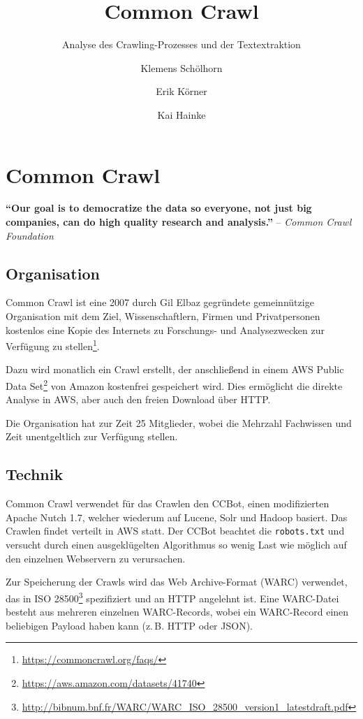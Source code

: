 \documentclass[a4paper,12pt,titlepage=false]{scrreprt}
\title{\vspace{3cm}Common Crawl}
\subtitle{Analyse des Crawling-Prozesses und der Textextraktion}
\author{Klemens Schölhorn \and Erik Körner \and Kai Hainke}
\begin{document}
\maketitle
\vspace{2cm}
\tableofcontents

\onehalfspacing

\chapter{Common Crawl}

\textbf{``Our goal is to democratize the data so everyone, not just big companies, can do high quality research and analysis.''}
\hfill-- \textit{Common Crawl Foundation}

\section{Organisation}

Common Crawl ist eine 2007 durch Gil Elbaz gegründete gemeinnützige Organisation mit dem Ziel, Wissenschaftlern, Firmen und Privatpersonen kostenlos eine Kopie des Internets zu Forschungs- und Analysezwecken zur Verfügung zu stellen\footnote{\url{https://commoncrawl.org/faqs/}}.

Dazu wird monatlich ein Crawl erstellt, der anschließend in einem AWS Public Data Set\footnote{\url{https://aws.amazon.com/datasets/41740}} von Amazon kostenfrei gespeichert wird. Dies ermöglicht die direkte Analyse in AWS, aber auch den freien Download über HTTP.

Die Organisation hat zur Zeit 25 Mitglieder, wobei die Mehrzahl Fachwissen und Zeit unentgeltlich zur Verfügung stellen.

\section{Technik}

Common Crawl verwendet für das Crawlen den CCBot, einen modifizierten Apache Nutch 1.7, welcher wiederum auf Lucene, Solr und Hadoop basiert. Das Crawlen findet verteilt in AWS statt. Der CCBot beachtet die \texttt{robots.txt} und versucht durch einen ausgeklügelten Algorithmus so wenig Last wie möglich auf den einzelnen Webservern zu verursachen.

Zur Speicherung der Crawls wird das Web Archive-Format (WARC) verwendet, das in ISO 28500\footnote{\url{http://bibnum.bnf.fr/WARC/WARC_ISO_28500_version1_latestdraft.pdf}} spezifiziert und an HTTP angelehnt ist. Eine WARC-Datei besteht aus mehreren einzelnen WARC-Records, wobei ein WARC-Record einen beliebigen Payload haben kann (z.\,B. HTTP oder JSON).
\end{document}
